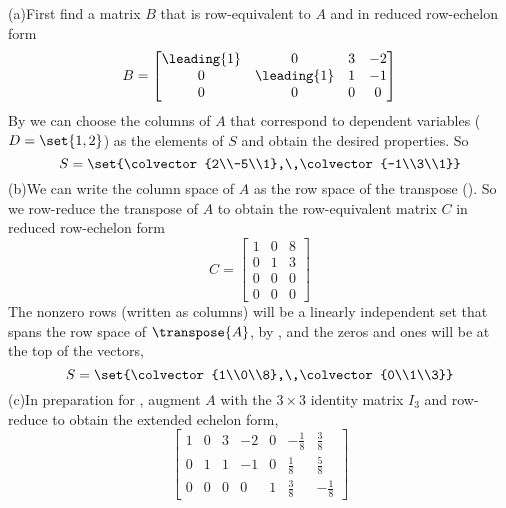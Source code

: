 (a)\quad First find a matrix $B$ that is row-equivalent to $A$ and in reduced row-echelon form
%
\begin{equation*}
B=
\begin{bmatrix}
\leading{1} & 0 & 3 & -2\\ 
0 & \leading{1} & 1 & -1\\ 
0 & 0 & 0 & 0
\end{bmatrix}
\end{equation*}
%
By  we can choose the columns of $A$ that correspond to dependent variables ($D=\set{1,2}$) as the elements of $S$ and obtain the desired properties.  So
%
\begin{equation*}
S=\set{\colvector{2\\-5\\1},\,\colvector{-1\\3\\1}}
\end{equation*}
%
(b)\quad  We can write the column space of $A$ as the row space of the transpose ().  So we row-reduce the transpose of $A$ to obtain the row-equivalent matrix $C$ in reduced row-echelon form
%
\begin{equation*}
C=
\begin{bmatrix}
1 & 0 & 8\\ 
0 & 1 & 3\\ 
0 & 0 & 0\\ 
0 & 0 & 0
\end{bmatrix}
\end{equation*}
%
The nonzero rows (written as columns) will be a linearly independent set that spans the row space of $\transpose{A}$, by , and the zeros and ones will be at the top of the vectors,
%
\begin{equation*}
S=\set{\colvector{1\\0\\8},\,\colvector{0\\1\\3}}
\end{equation*}
%
(c)\quad In preparation for , augment $A$ with the $3\times 3$ identity matrix $I_3$ and row-reduce to obtain the extended echelon form,
%
\begin{equation*}
\begin{bmatrix}
1 & 0 & 3 & -2 & 0 & -\frac{1}{8} & \frac{3}{8}\\
0 & 1 & 1 & -1 & 0 & \frac{1}{8} & \frac{5}{8}\\
0 & 0 & 0 & 0 & 1 & \frac{3}{8} & -\frac{1}{8}
\end{bmatrix}
\end{equation*}
